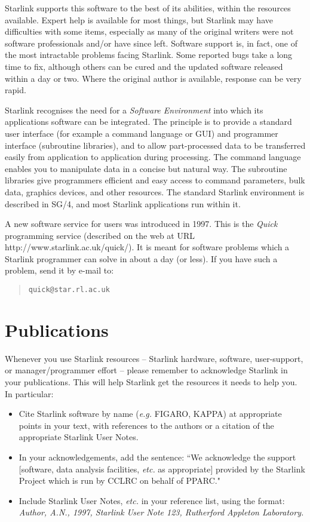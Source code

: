 \documentclass[twoside]{article}
\newcommand{\htmladdnormallink}[2]{#1}
\newcommand{\xref}[3]{#1}
\begin{document}
Starlink supports this software to the best of its abilities, within the
resources available.
Expert help is available for most things, but Starlink may have difficulties
with some items, especially as many of the original writers were not software
professionals and/or have since left.
Software support is, in fact, one of the most intractable problems facing
Starlink.
Some reported bugs take a long time to fix, although others can be cured
and the updated software released within a day or two.
Where the original author is available, response can be very rapid.

Starlink recognises the need for a {\em Software Environment}\/ into which its
applications software can be integrated.
The principle is to provide a standard user interface (for example a command
language or GUI) and programmer interface (subroutine libraries), and to allow
part-processed data to be transferred easily from application to application
during processing.
The command language enables you to manipulate data in a concise but natural
way.
The subroutine libraries give programmers efficient and easy access to
command parameters, bulk data, graphics devices, and other resources.
The standard Starlink environment is described in
\xref{SG/4}{sg4}{},
and most Starlink applications run within it.

A new software service for users was introduced in 1997.
This is the {\em Quick}\/ programming service (described on the web at URL
\htmladdnormallink{http://www.starlink.ac.uk/quick/}
{http://www.starlink.ac.uk/quick/}).
It is meant for software problems which a Starlink programmer can solve in
about a day (or less).
If you have such a problem, send it by e-mail to:
\begin{quote}
{\tt quick@star.rl.ac.uk}
\end{quote}

\newpage

\section{Publications}

Whenever you use Starlink resources -- Starlink hardware, software,
user-support, or manager/programmer effort -- please remember to acknowledge
Starlink in your publications.
This will help Starlink get the resources it needs to help you.
In particular:
\begin{itemize}
\item Cite Starlink software by name ({\em e.g.}\/ FIGARO, KAPPA) at
appropriate points in your text, with references to the authors or a citation
of the appropriate Starlink User Notes.
\item In your acknowledgements, add the sentence: ``We acknowledge the support
[software, data analysis facilities, {\em etc.}\/ as appropriate] provided
by the Starlink Project which is run by CCLRC on behalf of PPARC."
\item Include Starlink User Notes, {\em etc.}\/ in your reference list, using
the format:\\
{\em Author, A.N., 1997, Starlink User Note 123, Rutherford Appleton
Laboratory.}
\end{itemize}
\end{document}

